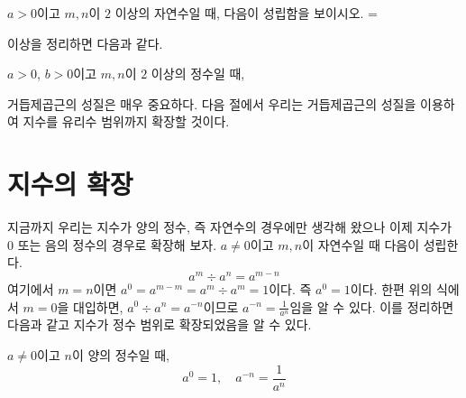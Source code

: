\documentclass[11pt, a4paper]{book}
\begin{document}
\begin{problem}
	$a>0$이고 $m, n$이 $2$ 이상의 자연수일 때, 다음이 성립함을 보이시오.
	 {=}
	
\end{problem}

이상을 정리하면 다음과 같다.
\begin{theorem}[거듭제곱근의 성질]
$a>0$, $b>0$이고 $m, n$이 $2$ 이상의 정수일 때,
\end{theorem}

거듭제곱근의 성질은 매우 중요하다. 다음 절에서 우리는 거듭제곱근의 성질을 이용하여 지수를 유리수 범위까지 확장할 것이다.

\section{지수의 확장}
 지금까지 우리는 지수가 양의 정수, 즉 자연수의 경우에만 생각해 왔으나 이제 지수가 $0$ 또는 음의 정수의 경우로 확장해 보자. $a \neq 0$이고 $m, n$이 자연수일 때 다음이 성립한다.
 \[
 a^m \div a^n = a^{m-n}
 \]
 여기에서 $m=n$이면 $a^{0} =a^{m-m} = a^m \div a^m =1$이다. 즉 $a^{0}=1$이다. 한편 위의 식에서 $m=0$을 대입하면,
 $a^0 \div a^n = a^{-n}$이므로 $a^{-n} =\frac{1}{a^n}$임을 알 수 있다. 이를 정리하면 다음과 같고 지수가 정수 범위로 확장되었음을 알 수 있다.
 \begin{theorem}[$0$ 또는 음의 정수의 지수]
 $a \neq 0$이고 $n$이 양의 정수일 때,
 \[
 a^{0} = 1, \quad a^{-n} = \frac{1}{a^n}
 \]
 \end{theorem}
\end{document}
